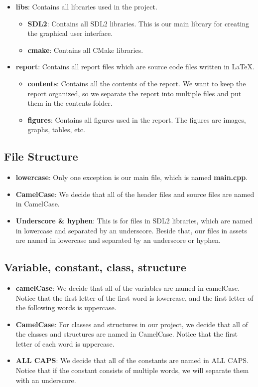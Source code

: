 \begin{itemize}
\begin{itemize}
    \end{itemize}
    \item \textbf{libs}: Contains all libraries used in the project.
    \begin{itemize}
        \item \textbf{SDL2}: Contains all SDL2 libraries. This is our main library for creating the graphical user interface.
        \item \textbf{cmake}: Contains all CMake libraries.
    \end{itemize}
    \item \textbf{report}: Contains all report files which are source code files written in LaTeX.
    \begin{itemize}
        \item \textbf{contents}: Contains all the contents of the report. We want to keep the report organized, so we separate the report into multiple files and put them in the contents folder.
        \item \textbf{figures}: Contains all figures used in the report. The figures are images, graphs, tables, etc.
    \end{itemize}
\end{itemize}

\subsection{File Structure}
\begin{itemize}
    \item \textbf{lowercase}: Only one exception is our main file, which is named \textbf{main.cpp}.
    \item \textbf{CamelCase}: We decide that all of the header files and source files are named in CamelCase.
    \item \textbf{Underscore \& hyphen}: This is for files in SDL2 libraries, which are named in lowercase and separated by an underscore. Beside that, our files in assets are named in lowercase and separated by an underscore or hyphen.
\end{itemize}

\subsection{Variable, constant, class, structure}
\begin{itemize}
    \item \textbf{camelCase}: We decide that all of the variables are named in camelCase. Notice that the first letter of the first word is lowercase, and the first letter of the following words is uppercase.
    \item \textbf{CamelCase}: For classes and structures in our project, we decide that all of the classes and structures are named in CamelCase. Notice that the first letter of each word is uppercase.
    \item \textbf{ALL CAPS}: We decide that all of the constants are named in ALL CAPS. Notice that if the constant consists of multiple words, we will separate them with an underscore.
\end{itemize}

